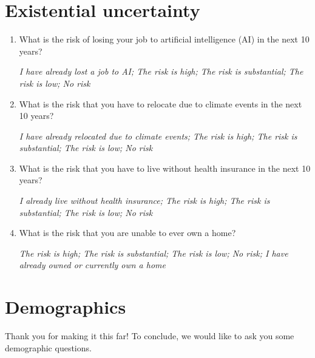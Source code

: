 \documentclass[11pt, headsepline]{article}
\begin{document}
\section*{Existential uncertainty}

\begin{enumerate}[resume]

    \item What is the risk of losing your job to artificial intelligence (AI) in the next 10 years?

    \textit{I have already lost a job to AI; The risk is high; The risk is substantial; The risk is low; No risk}

    \item What is the risk that you have to relocate due to climate events in the next 10 years?

    \textit{I have already relocated due to climate events; The risk is high; The risk is substantial; The risk is low; No risk}

    \item What is the risk that you have to live without health insurance in the next 10 years?

    \textit{I already live without health insurance; The risk is high; The risk is substantial; The risk is low; No risk}

    \item What is the risk that you are unable to ever own a home?

    \textit{The risk is high; The risk is substantial; The risk is low; No risk; I have already owned or currently own a home}

\end{enumerate}

\section*{Demographics}

Thank you for making it this far! To conclude, we would like to ask you some demographic questions.
\end{document}
